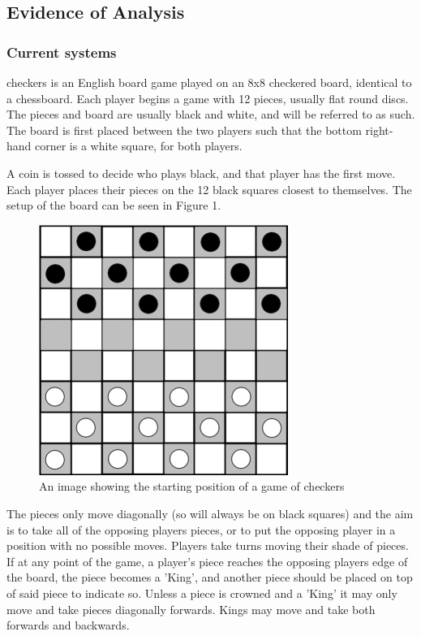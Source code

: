 \documentclass{article}
\makeatletter
\newcommand\subsubsubsection{\@startsection{paragraph}{4}{\z@}{-2.5ex\@plus -1ex \@minus -.25ex}{1.25ex \@plus .25ex}{\normalfont\normalsize\bfseries}}
\makeatother
\begin{document}
    \subsection{Evidence of Analysis}

    \subsubsection{Current systems}

    \subsubsubsection{checkers} \label{checkers}
    checkers is an English board game played on an 8x8 checkered board, identical to a chessboard.
    Each player begins a game with 12 pieces, usually flat round discs.
    The pieces and board are usually black and white, and will be referred to as such.
    The board is first placed between the two players such that the bottom right-hand corner is a white square,
    for both players.
    
    A coin is tossed to decide who plays black, and that player has the first move. Each player places their pieces
    on the 12 black squares closest to themselves. The setup of the board can be seen in Figure 1. 

    \begin{figure}
        \centering
        \includegraphics[scale=0.35]{The-starting-position-for-checkers.png}
        \caption{An image showing the starting position of a game of checkers}
    \end{figure}
    The pieces only move diagonally (so will always be on black squares)
    and the aim is to take all of the opposing players pieces, or to put the opposing player in a position with no possible moves.
    Players take turns moving their shade of pieces. If at any point of the game, a player's piece reaches the opposing players edge
    of the board, the piece becomes a 'King', and another piece should be placed on top of said piece to indicate so.
    Unless a piece is crowned and a 'King' it may only move and take pieces diagonally forwards. Kings may move and take both forwards and backwards.
    
\end{document}
